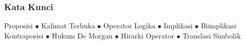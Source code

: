 \documentclass[handout]{beamer}
\theoremstyle{definition}
\theoremstyle{example}
\begin{document}
\begin{frame}
\frametitle{Kata Kunci}
\begin{center}
Proposisi $\bullet$ Kalimat Terbuka $\bullet$ Operator Logika $\bullet$ Implikasi $\bullet$ Biimplikasi\\
Kontraposisi $\bullet$ Hukum De Morgan $\bullet$ Hirarki Operator $\bullet$ Translasi Simbolik
\end{center}
\end{frame}
\end{document}
